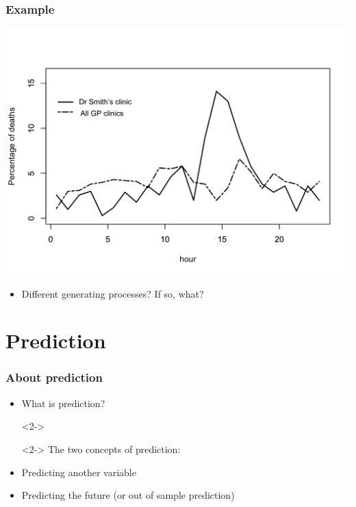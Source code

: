 \documentclass[aspectratio=43]{beamer}
\begin{document}
\begin{frame}
\frametitle{Example}
\centering

\includegraphics[width = \textwidth]{../img/shipman}

\begin{itemize}
  \item Different generating processes? If so, what?
\end{itemize}

\end{frame}

\section{Prediction}

\begin{frame}
\frametitle{About prediction}
\centering

\begin{itemize}
  \item<1-> What is prediction?
  \item[]<2->
  \item[]<2-> The two concepts of prediction:
  \item<2-> Predicting another variable
  \item<2-> Predicting the future (or out of sample prediction)
\end{itemize}

\end{frame}
\end{document}
